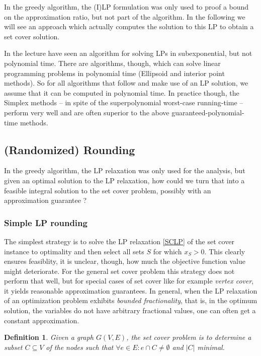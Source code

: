 \documentclass{article}
\newtheorem{definition}{Definition}
\begin{document}
In the greedy algorithm, the (I)LP formulation was only used to proof a bound on the approximation ratio, but not part of
the algorithm. In the following we will see an approach which actually computes the solution to this LP to obtain
a set cover solution.

 In the lecture have seen an algorithm for solving LPs in subexponential, but not polynomial time. There are
algorithms, though, which can solve linear programming problems in polynomial time (Ellipsoid and interior point methods).
So for all algorithms that follow and make use of an LP solution, we assume that it can be computed in polynomial time.
In practice though, the Simplex methods -- in spite of the superpolynomial worst-case running-time -- perform very well
and are often superior to the above guaranteed-polynomial-time methods.

\subsection{(Randomized) Rounding}
In the greedy algorithm, the LP relaxation was only used for the analysis, but given an optimal solution to the LP relaxation, how could we turn that into a feasible integral solution to the set cover problem, possibly with an approximation guarantee ?

\subsubsection{Simple LP rounding}
The simplest strategy is to solve the  LP relaxation \ref{SCLP} of the  set cover instance to optimality and then select all sets $S$ for which $x_S>0$. This clearly ensures feasiblity, it is unclear, though, how much the objective function value might deteriorate. 
For the general set cover problem this strategy does not perform that well, but for special cases of set cover like for example \emph{vertex cover}, it yields reasonable approximation guarantees. In general, when the LP relaxation of an optimization problem exhibits \emph{bounded fractionality}, that is, in the optimum solution, the variables do not have arbitrary fractional values, one can often get a constant approximation.

\begin{definition}
Given a graph $G(V,E)$, the \emph{set cover} problem is to determine a subset $C\subseteq V$ of the nodes
such that $\forall e\in E: e\cap C\neq \emptyset$ and $|C|$ minimal.
\end{definition}
\end{document}
